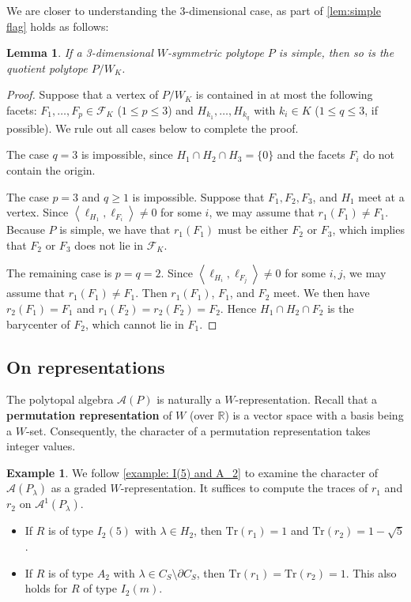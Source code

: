 \documentclass{amsart}
\theoremstyle{plain} \numberwithin{equation}{section}
\newtheorem{lemma}[theorem]{Lemma}
\theoremstyle{definition}
\newtheorem{example}[theorem]{Example}
\newcommand{\R}{\mathbb{R}}
\newcommand{\ip}[1]{\left\langle #1 \right\rangle}
\begin{document}
We are closer to understanding the 3-dimensional case, as part of \cref{lem:simple flag} holds as follows:
\begin{lemma}
  If a 3-dimensional $W$-symmetric polytope $P$ is simple, then so is the quotient polytope $P/W_K$.
\end{lemma}
\begin{proof}
  Suppose that a vertex of $P/W_K$ is contained in at most the following facets: $F_1,\ldots,F_p \in \mathcal{F}_K$ ($1 \le p \le 3$) and $H_{k_1},\ldots,H_{k_q}$ with $k_i \in K$ ($1 \le q \le 3$, if possible). We rule out all cases below to complete the proof.

  The case $q = 3$ is impossible, since $H_1 \cap H_2 \cap H_3 = \{0\}$ and the facets $F_i$ do not contain the origin.
  

  The case $p = 3$ and $q \ge 1$ is impossible. Suppose that $F_1, F_2, F_3$, and $H_1$ meet at a vertex. Since $\ip{\ell_{H_1}, \ell_{F_i}} \ne 0$ for some $i$, we may assume that $r_1(F_1) \ne F_1$. Because $P$ is simple, we have that $r_1(F_1)$ must be either $F_2$ or $F_3$, which implies that $F_2$ or $F_3$ does not lie in $\mathcal{F}_K$.

  The remaining case is $p = q = 2$. Since $\ip{\ell_{H_i}, \ell_{F_j}} \ne 0$ for some $i, j$, we may assume that $r_1(F_1) \ne F_1$. Then $r_1(F_1)$, $F_1$, and $F_2$ meet.
We then have $r_2(F_1) = F_1$ and $r_1(F_2) = r_2(F_2) = F_2$. Hence $H_1 \cap H_2 \cap F_2$ is the barycenter of $F_2$, which cannot lie in $F_1$.
   \qedhere
\end{proof}


\subsection{On representations} The polytopal algebra $\mathcal{A}(P)$ is naturally a $W$-representation. Recall that a \textbf{permutation representation} of $W$ (over $\R$) is a vector space with a basis being  a $W$-set. Consequently, the character of a permutation representation takes integer values.



\begin{example}
  We follow \cref{example: I(5) and A_2} to examine the character of $\mathcal{A}(P_{\lambda})$ as a graded $W$-representation. 
  It suffices to compute the traces of $r_1$ and $r_2$ on $\mathcal{A}^1(P_{\lambda})$.
  \begin{itemize}
      \item If $R$ is of type $I_2(5)$ with $\lambda\in H_2$, then $\mathrm{Tr}(r_1)=1$ and $\mathrm{Tr}(r_2)=1-\sqrt{5}$.
      \item If $R$ is of type $A_2$ with $\lambda\in C_S\setminus\partial C_S$, then $\mathrm{Tr}(r_1)=\mathrm{Tr}(r_2)=1$. This  also holds for  $R$  of type $I_2(m)$.
    \end{itemize}
\end{example}
\end{document}
